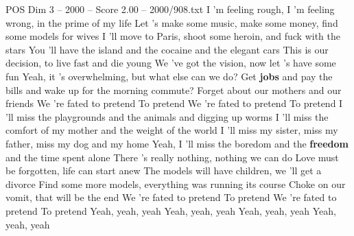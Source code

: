 \begin{textsample}{POS Dim 3 – 2000 – Score 2.00 – 2000/908.txt}  \label{ex:f3_pos_033}
I 'm feeling rough, I 'm feeling wrong, in the prime of my life Let 's make some music, make some money, find some models for wives I 'll move to Paris, shoot some heroin, and fuck with the stars You 'll have the island and the cocaine and the elegant cars This is our decision, to live fast and die young We 've got the vision, now let 's have some fun Yeah, it 's overwhelming, but what else can we do?
Get \textbf{jobs} and pay the bills and wake up for the morning commute?
Forget about our mothers and our friends We 're fated to pretend To pretend We 're fated to pretend To pretend I 'll miss the playgrounds and the animals and digging up worms I 'll miss the comfort of my mother and the weight of the world I 'll miss my sister, miss my father, miss my dog and my home Yeah, I 'll miss the boredom and the \textbf{freedom} and the time spent alone There 's really nothing, nothing we can do Love must be forgotten, life can start anew The models will have children, we 'll get a divorce Find some more models, everything was running its course Choke on our vomit, that will be the end We 're fated to pretend To pretend We 're fated to pretend To pretend Yeah, yeah, yeah Yeah, yeah, yeah Yeah, yeah, yeah Yeah, yeah, yeah

\end{textsample}
